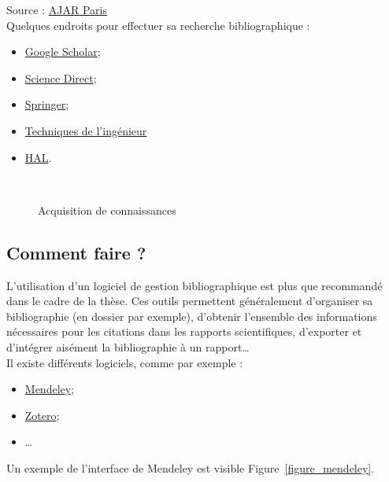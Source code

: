 \documentclass[a4paper,12pt]{report}
\begin{document}
Source : \href{http://www.ajar-online.fr/thesememoire-2-recherche-bibliographique/}{AJAR Paris}    \\

Quelques endroits pour effectuer sa recherche bibliographique :
\begin{itemize}
\item \href{https://scholar.google.fr/}{Google Scholar};
\item \href{https://www-sciencedirect-com.camphrier-1.grenet.fr/}{Science Direct};
\item \href{https://link-springer-com.camphrier-1.grenet.fr/}{Springer};
\item \href{https://www-techniques-ingenieur-fr.camphrier-1.grenet.fr/}{Techniques de l'ingénieur}
\item \href{https://hal.archives-ouvertes.fr/}{HAL}.
\end{itemize}

\ \\

\begin{figure}[hbtp]
	\centering
	\def\svgwidth{1\columnwidth}
	\fontsize{10pt}{10pt}\selectfont
	\caption{Acquisition de connaissances}
	\label{figure_bouquins}
\end{figure}



\subsection{Comment faire ?}
L'utilisation d'un logiciel de gestion bibliographique est plus que recommandé dans le cadre de la thèse. Ces outils permettent généralement d'organiser sa bibliographie (en dossier par exemple), d'obtenir l'ensemble des informations nécessaires pour les citations dans les rapports scientifiques, d'exporter et d'intégrer aisément la bibliographie à un rapport\ldots \\

Il existe différents logiciels, comme par exemple : 
\begin{itemize}
\item \href{https://www.mendeley.com/}{Mendeley}; 
\item \href{https://www.zotero.org/}{Zotero};
\item \ldots 
\end{itemize}

Un exemple de l'interface de Mendeley est visible Figure~\ref{figure_mendeley}.
\end{document}
